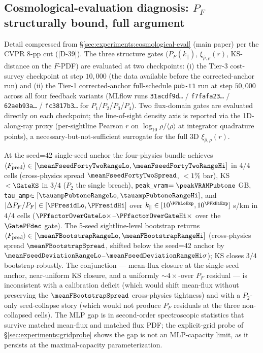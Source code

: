 \subsection{Cosmological-evaluation diagnosis: $P_F$ structurally bound, full argument}
\label{sec:suppl:exp:cosmological-diagnosis}
Detail compressed from \S\ref{sec:experiments:cosmological-eval} (main paper) per the CVPR 8-pp cut ([D-39]). The three structure gates ($P_F(k_\parallel)$, $\xi_{\hat\rho,\rho}(r)$, KS-distance on the $F$-PDF) are evaluated at two checkpoints: (i) the Tier-3 cost-survey checkpoint at step $10{,}000$ (the data available before the corrected-anchor run) and (ii) the Tier-1 corrected-anchor full-schedule \texttt{pub-t1} run at step $50{,}000$ across all four feedback variants (MLflow runs \texttt{31acdf9d\dots} / \texttt{f7fafa23\dots} / \texttt{62aeb93a\dots} / \texttt{fc3817b3\dots} for $P_1$/$P_2$/$P_3$/$P_4$). Two flux-domain gates are evaluated directly on each checkpoint; the line-of-sight density axis is reported via the 1D-along-ray proxy (per-sightline Pearson $r$ on $\log_{10}\rho/\langle\rho\rangle$ at integrator quadrature points), a necessary-but-not-sufficient surrogate for the full 3D $\xi_{\hat\rho,\rho}(r)$.

At the seed=42 single-seed anchor the four-physics bundle achieves $\langle F_{\text{pred}}\rangle \in [\meanFseedFortyTwoRangeLo, \meanFseedFortyTwoRangeHi]$ in $4/4$ cells (cross-physics spread $\meanFseedFortyTwoSpread$, $<\!1\%$ bar), KS$\,<\GateKS$ in $3/4$ ($P_2$ the single breach), \texttt{peak\_vram}$=\peakVRAMPubtone$ GB, \texttt{tau\_amp}$\in[\tauampPubtoneRangeLo, \tauampPubtoneRangeHi]$, and $|\Delta P_F/P_F| \in [\PFresidLo, \PFresidHi]$ over $k_\parallel \in [10^{\PFkLoExp}, 10^{\PFkHiExp}]$ s/km in $4/4$ cells ($\PFfactorOverGateLo\times$--$\PFfactorOverGateHi\times$ over the $\GatePFdec$ gate). The 5-seed sightline-level bootstrap returns $\langle F_{\rm pred}\rangle \in [\meanFBootstrapRangeLo, \meanFBootstrapRangeHi]$ (cross-physics spread $\meanFBootstrapSpread$, shifted below the seed=42 anchor by $\meanFseedDeviationRangeLo$--$\meanFseedDeviationRangeHi\sigma$); KS closes $3/4$ bootstrap-robustly. The conjunction --- mean-flux closure at the single-seed anchor, near-uniform KS closure, and a uniformly $\sim\!4\times$-over $P_F$ residual --- is inconsistent with a calibration deficit (which would shift mean-flux without preserving the $\meanFBootstrapSpread$ cross-physics tightness) and with a $P_2$-only seed-collapse story (which would not produce $P_F$ residuals at the three non-collapsed cells). The MLP gap is in second-order spectroscopic statistics that survive matched mean-flux and matched flux PDF; the explicit-grid probe of \S\ref{sec:experiments:gridprobe} shows the gap is not an MLP-capacity limit, as it persists at the maximal-capacity parameterization.

